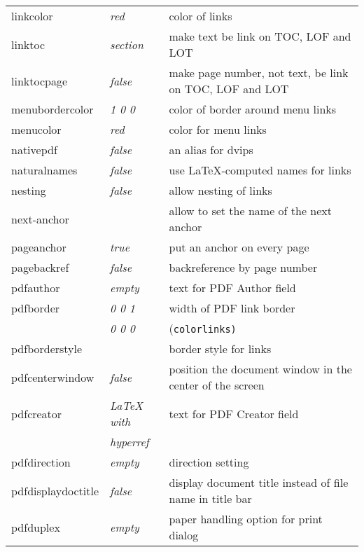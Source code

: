 \documentclass{article}
\begin{document}
\begin{longtable}{@{}>{\ttfamily}llp{7cm}@{}}
linkcolor          & \textit{red}           & color of links \\
linktoc            & \textit{section}       & make text be link on TOC, LOF and LOT \\
linktocpage        & \textit{false}         & make page number, not text, be link on TOC, LOF and LOT \\
menubordercolor    & \textit{1 0 0}         & color of border around menu links \\
menucolor          & \textit{red}           & color for menu links \\
nativepdf          & \textit{false}         & an alias for \textsf{dvips} \\
naturalnames       & \textit{false}         & use \LaTeX-computed names for links \\
nesting            & \textit{false}         & allow nesting of links \\
next-anchor        &                        & allow to set the name of the next anchor\\
pageanchor         & \textit{true}          & put an anchor on every page \\
pagebackref        & \textit{false}         & backreference by page number \\
pdfauthor          & \textit{empty}         & text for PDF Author field \\
pdfborder          & \textit{0 0 1}         & width of PDF link border \\
                   & \textit{0 0 0}         & (\texttt{colorlinks)} \\
pdfborderstyle     &                        & border style for links \\
pdfcenterwindow    & \textit{false}         & position the document window in the center of the screen \\
pdfcreator         & \textit{LaTeX with}    & text for PDF Creator field \\
                   & \textit{hyperref}      & \\
pdfdirection       & \textit{empty}         & direction setting \\
pdfdisplaydoctitle & \textit{false}         & display document title instead
                                              of file name in title bar\\
pdfduplex          & \textit{empty}         & paper handling option for
                                              print dialog\\

\end{longtable}
\end{document}
